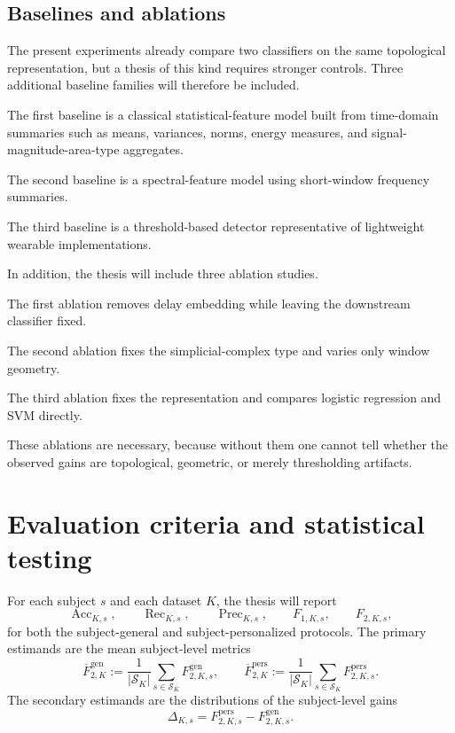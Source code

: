 \documentclass[11pt]{article}
\DeclareMathOperator{\Rec}{Rec}
\DeclareMathOperator{\Prec}{Prec}
\DeclareMathOperator{\Acc}{Acc}
\newcommand{\1}{\mathbf 1}
\newcommand{\Sset}{\mathcal S}
\begin{document}
\subsection{Baselines and ablations}

The present experiments already compare two classifiers on the same topological representation, but a thesis of this kind requires stronger controls. Three additional baseline families will therefore be included.

The first baseline is a classical statistical-feature model built from time-domain summaries such as means, variances, norms, energy measures, and signal-magnitude-area-type aggregates.

The second baseline is a spectral-feature model using short-window frequency summaries.

The third baseline is a threshold-based detector representative of lightweight wearable implementations.

In addition, the thesis will include three ablation studies.

The first ablation removes delay embedding while leaving the downstream classifier fixed.

The second ablation fixes the simplicial-complex type and varies only window geometry.

The third ablation fixes the representation and compares logistic regression and SVM directly.

These ablations are necessary, because without them one cannot tell whether the observed gains are topological, geometric, or merely thresholding artifacts.

\section{Evaluation criteria and statistical testing}

For each subject $s$ and each dataset $K$, the thesis will report
\[
  \Acc_{K,s},\qquad \Rec_{K,s},\qquad \Prec_{K,s},\qquad F_{1,K,s},\qquad F_{2,K,s},
\]
for both the subject-general and subject-personalized protocols. The primary estimands are the mean subject-level metrics
\[
  \overline{F}_{2,K}^{\mathrm{gen}}:=\frac{1}{|\Sset_K|}\sum_{s\in\Sset_K}F_{2,K,s}^{\mathrm{gen}},
  \qquad
  \overline{F}_{2,K}^{\mathrm{pers}}:=\frac{1}{|\Sset_K|}\sum_{s\in\Sset_K}F_{2,K,s}^{\mathrm{pers}}.
\]
The secondary estimands are the distributions of the subject-level gains
\[
  \Delta_{K,s}=F_{2,K,s}^{\mathrm{pers}}-F_{2,K,s}^{\mathrm{gen}}.
\]
\end{document}
